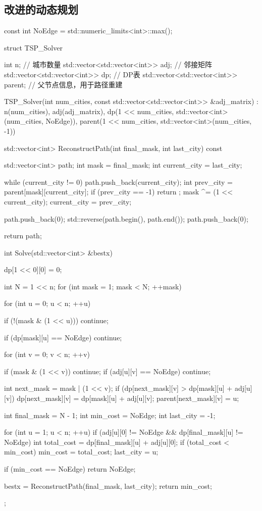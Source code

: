 \subsection{改进的动态规划}
\begin{cppcode}
const int NoEdge = std::numeric_limits<int>::max();

struct TSP_Solver {
    int n; // 城市数量
    std::vector<std::vector<int>> adj; // 邻接矩阵
    std::vector<std::vector<int>> dp; // DP表
    std::vector<std::vector<int>> parent; // 父节点信息，用于路径重建

    TSP_Solver(int num_cities, const std::vector<std::vector<int>> &adj_matrix)
        : n(num_cities), adj(adj_matrix),
          dp(1 << num_cities, std::vector<int>(num_cities, NoEdge)),
          parent(1 << num_cities, std::vector<int>(num_cities, -1)) {}

    std::vector<int> ReconstructPath(int final_mask, int last_city) const {
        std::vector<int> path;
        int mask = final_mask;
        int current_city = last_city;

        while (current_city != 0) { 
            path.push_back(current_city);
            int prev_city = parent[mask][current_city];
            if (prev_city == -1) {
                return {};
            }
            mask ^= (1 << current_city);
            current_city = prev_city;
        }

        path.push_back(0);
        std::reverse(path.begin(), path.end());
        path.push_back(0); 

        return path;
    }

    int Solve(std::vector<int> &bestx) {
        dp[1 << 0][0] = 0;

        int N = 1 << n; 
        for (int mask = 1; mask < N; ++mask) {
            for (int u = 0; u < n; ++u) {
                if (!(mask & (1 << u))) continue;

                if (dp[mask][u] == NoEdge) continue;

                for (int v = 0; v < n; ++v) {
                    if (mask & (1 << v)) continue;
                    if (adj[u][v] == NoEdge) continue;

                    int next_mask = mask | (1 << v);
                    if (dp[next_mask][v] > dp[mask][u] + adj[u][v]) {
                        dp[next_mask][v] = dp[mask][u] + adj[u][v];
                        parent[next_mask][v] = u;
                    }
                }
            }
        }

        int final_mask = N - 1;
        int min_cost = NoEdge;
        int last_city = -1;

        for (int u = 1; u < n; ++u) {
            if (adj[u][0] != NoEdge && dp[final_mask][u] != NoEdge) {
                int total_cost = dp[final_mask][u] + adj[u][0];
                if (total_cost < min_cost) {
                    min_cost = total_cost;
                    last_city = u;
                }
            }
        }

        if (min_cost == NoEdge) {
            return NoEdge;
        }

        bestx = ReconstructPath(final_mask, last_city);
        return min_cost;
    }
};
\end{cppcode}